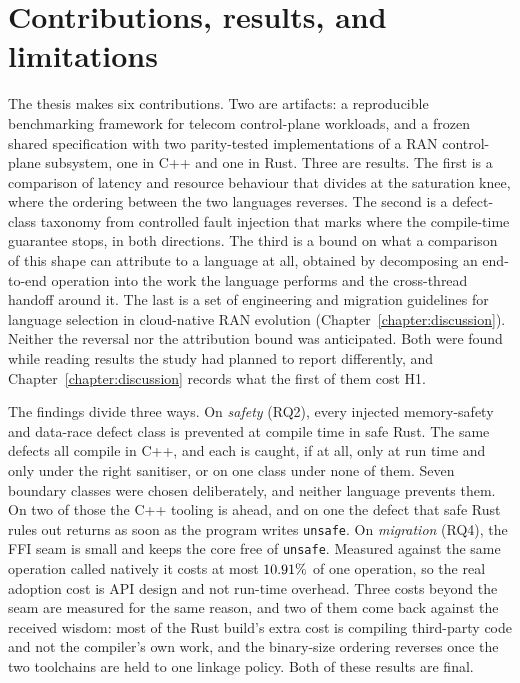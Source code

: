 \documentclass[english,twoside,openright,a4paper,censored,csm,software-track-2020]{HYthesisML}
\begin{document}
\section{Contributions, results, and limitations}
The thesis makes six contributions. Two are artifacts: a reproducible benchmarking framework
for telecom control-plane workloads, and a frozen shared specification with two parity-tested
implementations of a RAN control-plane subsystem, one in C++ and one in Rust. Three are
results. The first is a comparison of latency and resource behaviour that divides at the
saturation knee, where the ordering between the two languages reverses. The second is a
defect-class taxonomy from controlled fault injection that marks where the compile-time
guarantee stops, in both directions. The third is a bound on what a comparison of this shape can
attribute to a language at all, obtained by decomposing an end-to-end operation into the work the
language performs and the cross-thread handoff around it. The last is a set of engineering and
migration guidelines for language selection in cloud-native RAN evolution
(Chapter~\ref{chapter:discussion}). Neither the reversal nor the attribution bound was anticipated.
Both were found while reading results the study had planned to report differently, and
Chapter~\ref{chapter:discussion} records what the first of them cost H1.

The findings divide three ways. On \emph{safety} (RQ2), every injected memory-safety and
data-race defect class is prevented at compile time in safe Rust. The same defects all compile
in C++, and each is caught, if at all, only at run time and only under the right sanitiser, or on
one class under none of them. Seven
boundary classes were chosen deliberately, and neither language prevents them. On two of those
the C++ tooling is ahead, and on one the defect that safe Rust rules out returns as soon as the
program writes \texttt{unsafe}. On \emph{migration} (RQ4), the FFI seam is small and keeps the core
free of \texttt{unsafe}. Measured against the same operation called natively it costs at most
$10.91\%$ of one operation, so the real adoption cost is API design and not run-time
overhead. Three costs beyond the seam are measured for the same reason, and two of them come back
against the received wisdom: most of the Rust build's extra cost is compiling third-party code and
not the compiler's own work, and the binary-size ordering reverses once the two toolchains are held
to one linkage policy. Both of these results are final.
\end{document}
